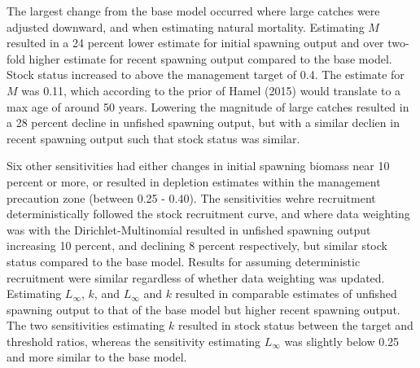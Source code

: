 \documentclass[11pt,
  english,
  a4paper,
]{article}
\begin{document}
\leavevmode\tagmcend\tagstructend\par


The largest change from the base model occurred where large catches were adjusted downward, and when estimating natural mortality. Estimating {\(M\)\leavevmode\tagmcend\tagstructend} resulted in a 24 percent lower estimate for initial spawning output and over two-fold higher estimate for recent spawning output compared to the base model. Stock status increased to above the management target of 0.4. The estimate for {\(M\)\leavevmode\tagmcend\tagstructend} was 0.11, which according to the prior of Hamel {(2015)\leavevmode\tagmcend\tagstructend} would translate to a max age of around 50 years. Lowering the magnitude of large catches resulted in a 28 percent decline in unfished spawning output, but with a similar declien in recent spawning output such that stock status was similar.

\leavevmode\tagmcend\tagstructend\par


Six other sensitivities had either changes in initial spawning biomass near 10 percent or more, or resulted in depletion estimates within the management precaution zone (between 0.25 - 0.40). The sensitivities wehre recruitment deterministically followed the stock recruitment curve, and where data weighting was with the Dirichlet-Multinomial resulted in unfished spawning output increasing 10 percent, and declining 8 percent respectively, but similar stock status compared to the base model. Results for assuming deterministic recruitment were similar regardless of whether data weighting was updated. Estimating {\(L_{\infty}\)\leavevmode\tagmcend\tagstructend}, {\(k\)\leavevmode\tagmcend\tagstructend}, and {\(L_{\infty}\)\leavevmode\tagmcend\tagstructend} and {\(k\)\leavevmode\tagmcend\tagstructend} resulted in comparable estimates of unfished spawning output to that of the base model but higher recent spawning output. The two sensitivities estimating {\(k\)\leavevmode\tagmcend\tagstructend} resulted in stock status between the target and threshold ratios, whereas the sensitivity estimating {\(L_{\infty}\)\leavevmode\tagmcend\tagstructend} was slightly below 0.25 and more similar to the base model.
\end{document}
